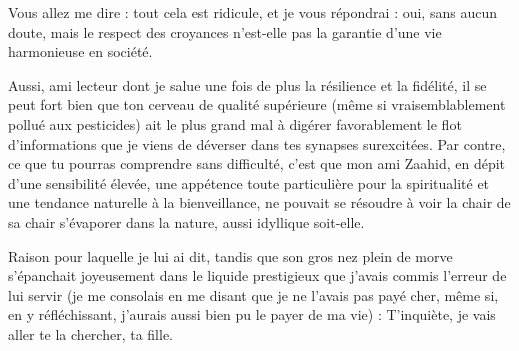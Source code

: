 
Vous allez me dire : tout cela est ridicule, et je vous répondrai : oui, sans aucun doute, mais le respect des croyances n’est-elle pas la garantie d’une vie harmonieuse en société.

Aussi, ami lecteur dont je salue une fois de plus la résilience et la fidélité, il se peut fort bien que ton cerveau de qualité supérieure (même si vraisemblablement pollué aux pesticides) ait le plus grand mal à digérer favorablement le flot d’informations que je viens de déverser dans tes synapses surexcitées. Par contre, ce que tu pourras comprendre sans difficulté, c’est que mon ami Zaahid, en dépit d’une sensibilité élevée, une appétence toute particulière pour la spiritualité et une tendance naturelle à la bienveillance, ne pouvait se résoudre à voir la chair de sa chair s’évaporer dans la nature, aussi idyllique soit-elle.

Raison pour laquelle je lui ai dit, tandis que son gros nez plein de morve s’épanchait joyeusement dans le liquide prestigieux que j’avais commis l’erreur de lui servir (je me consolais en me disant que je ne l’avais pas payé cher, même si, en y réfléchissant, j’aurais aussi bien pu le payer de ma vie) : T’inquiète, je vais aller te la chercher, ta fille.

